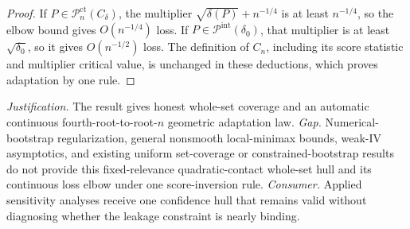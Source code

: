\documentclass{article}
\begin{document}
\begin{proof}
If \(P\in\mathcal P_n^{\mathrm{ct}}(C_\delta)\), the multiplier \(\sqrt{\delta(P)}+n^{-1/4}\) is at least \(n^{-1/4}\), so the elbow bound gives \(O(n^{-1/4})\) loss. If \(P\in\mathcal P^{\mathrm{int}}(\delta_0)\), that multiplier is at least \(\sqrt{\delta_0}\), so it gives \(O(n^{-1/2})\) loss. The definition of \(C_n\), including its score statistic and multiplier critical value, is unchanged in these deductions, which proves adaptation by one rule.
\end{proof}
\par\smallskip\noindent \textit{Justification.} The result gives honest whole-set coverage and an automatic continuous fourth-root-to-root-\(n\) geometric adaptation law. \textit{Gap.} Numerical-bootstrap regularization, general nonsmooth local-minimax bounds, weak-IV asymptotics, and existing uniform set-coverage or constrained-bootstrap results do not provide this fixed-relevance quadratic-contact whole-set hull and its continuous loss elbow under one score-inversion rule. \textit{Consumer.} Applied sensitivity analyses receive one confidence hull that remains valid without diagnosing whether the leakage constraint is nearly binding.
\end{document}
